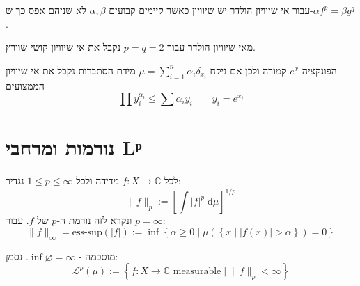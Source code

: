 \documentclass{tstextbook}
\begin{document}
\begin{remark}
עבור אי שיוויון הולדר יש שיוויון כאשר קיימים קבועים \(\alpha,\beta\) לא שניהם אפס כך ש-\(\alpha f^{p}=\beta g^{q}\). 

\end{remark}
\begin{remark}
מאי שיוויון הולדר עבור \(p=q=2\) נקבל את אי שיוויון קושי שוורץ.

\end{remark}
\begin{corollary}
הפונקציה \(e^{ x }\) קמורה ולכן אם ניקח \(\mu=\sum_{i=1}^{n}\alpha_{i}\delta_{x_{i}}\) מידת הסתברות נקבל את אי שיוויון הממצועים
$$\prod y_{i}^{\alpha _{i}}\leq \sum \alpha_{i}y_{i}\qquad y_{i}=e^{ x_{i} }$$

\end{corollary}
\section{נורמות ומרחבי Lᵖ}

\begin{definition}[נורמת \(p\) של \(f\)]
לכל \(f:X\to \mathbb{C}\) מדידה ולכל \(1\leq p \leq \infty\) נגדיר:
$$\lVert f \rVert _{p} := \left[ \int  \lvert f \rvert ^{p} \;\mathrm{d} \mu  \right]^{1/p}$$
ונקרא לזה נורמת ה-\(p\) של \(f\). עבור \(p=\infty\):
$$\lVert f \rVert _{\infty}=\text{ess-sup}\left( \lvert f \rvert  \right):= \inf \left\{  \alpha \geq 0 \mid \mu\left( \left\{  x\mid \lvert f(x) \rvert >\alpha  \right\} \right)=0  \right\}$$

\end{definition}
מוסכמה - \(\inf \varnothing = \infty\). נסמן:
$$\mathcal{L} ^{p}\left( \mu \right):=\left\{  f:X\to \mathbb{C} \text{ measurable}\mid \lVert f \rVert _{p}<\infty  
\right\}$$
\end{document}

